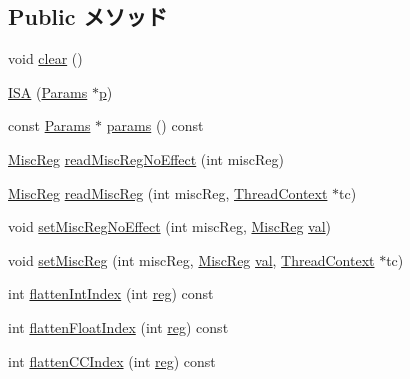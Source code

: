 \subsection*{Public メソッド}
\begin{DoxyCompactItemize}
\item 
void \hyperlink{classX86ISA_1_1ISA_ac8bb3912a3ce86b15842e79d0b421204}{clear} ()
\item 
\hyperlink{classX86ISA_1_1ISA_ae9132e021b3f3b20c917fc328a056bbd}{ISA} (\hyperlink{classX86ISA_1_1ISA_a479c84ea8074d124d1ddd320ef027439}{Params} $\ast$\hyperlink{namespaceX86ISA_af675c1d542a25b96e11164b80809a856}{p})
\item 
const \hyperlink{classX86ISA_1_1ISA_a479c84ea8074d124d1ddd320ef027439}{Params} $\ast$ \hyperlink{classX86ISA_1_1ISA_a7a20f1b985970cdbca22d0a4fbf09dd6}{params} () const 
\item 
\hyperlink{namespaceX86ISA_aa16539aa6584fd12f7d6fa868f75b4de}{MiscReg} \hyperlink{classX86ISA_1_1ISA_a8147f1448b78d0de3f86766175429e19}{readMiscRegNoEffect} (int miscReg)
\item 
\hyperlink{namespaceX86ISA_aa16539aa6584fd12f7d6fa868f75b4de}{MiscReg} \hyperlink{classX86ISA_1_1ISA_ac9a5ba47c1dd9552c65c3164fba45f20}{readMiscReg} (int miscReg, \hyperlink{classThreadContext}{ThreadContext} $\ast$tc)
\item 
void \hyperlink{classX86ISA_1_1ISA_a4b021ed77b93fc971a905c83bba97e38}{setMiscRegNoEffect} (int miscReg, \hyperlink{namespaceX86ISA_aa16539aa6584fd12f7d6fa868f75b4de}{MiscReg} \hyperlink{namespaceX86ISA_ae13bf1250853ff6b72aabe3c79b587cc}{val})
\item 
void \hyperlink{classX86ISA_1_1ISA_acb55d95b5d0cf15e23c7cdcfe03074f1}{setMiscReg} (int miscReg, \hyperlink{namespaceX86ISA_aa16539aa6584fd12f7d6fa868f75b4de}{MiscReg} \hyperlink{namespaceX86ISA_ae13bf1250853ff6b72aabe3c79b587cc}{val}, \hyperlink{classThreadContext}{ThreadContext} $\ast$tc)
\item 
int \hyperlink{classX86ISA_1_1ISA_aece4b88ffcab608652e8e9f0fbe643d4}{flattenIntIndex} (int \hyperlink{namespaceX86ISA_aeeb02ad833ab76f3430553ef93213a6b}{reg}) const 
\item 
int \hyperlink{classX86ISA_1_1ISA_a85addcd4f57c5a0ffa81805dcad1eeb7}{flattenFloatIndex} (int \hyperlink{namespaceX86ISA_aeeb02ad833ab76f3430553ef93213a6b}{reg}) const 
\item 
int \hyperlink{classX86ISA_1_1ISA_a7a5d7476bd10e5af09e6e753d1fca087}{flattenCCIndex} (int \hyperlink{namespaceX86ISA_aeeb02ad833ab76f3430553ef93213a6b}{reg}) const 

\end{DoxyCompactItemize}

